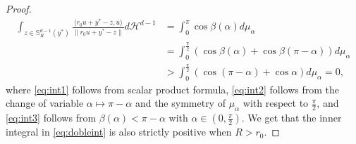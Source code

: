\documentclass[10pt,a4paper]{amsart}
\newcommand{\HH}{\mathcal{H}}
\renewcommand{\SS}{\mathbb{S}}
\begin{document}
\begin{proof}
    \begin{align}
        \int_{z\in\SS^{d-1}_R(y^*)}\frac{\langle r_0u+y^*-z, u\rangle}{\|r_0u+y^*-z\|}d\HH^{d-1} & = \int_0^\pi\cos\beta(\alpha)d\mu_\alpha \label{eq:int1}\\
        &= \int_0^{\frac{\pi}{2}}(\cos\beta(\alpha)+\cos\beta(\pi-\alpha) )d\mu_\alpha\label{eq:int2}\\
        & > \int_0^{\frac{\pi}{2}}(\cos(\pi-\alpha)+\cos \alpha )d\mu_\alpha=0,\label{eq:int3}
    \end{align}
where \eqref{eq:int1} follows from scalar product formula, \eqref{eq:int2} follows from the change of variable $\alpha\mapsto \pi-\alpha$ and the symmetry of $\mu_\alpha$ with respect to $\frac{\pi}{2}$, and \eqref{eq:int3} follows from $\beta(\alpha)< \pi-\alpha$ with $\alpha\in (0,\frac{\pi}{2})$. We get that the inner integral in \eqref{eq:dobleint} is also strictly positive when $R>r_0$.
\end{proof}
\end{document}
